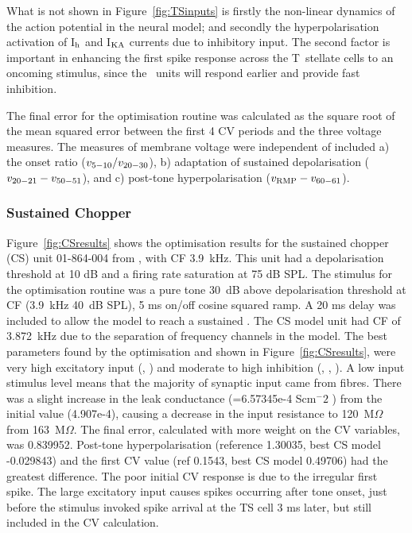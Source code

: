 

What is not shown in Figure~\ref{fig:TSinputs} is firstly the non-linear dynamics of the action potential in the neural model; and secondly the hyperpolarisation activation of I$_{\rm h}$ and I$_{\rm KA}$ currents due to inhibitory input.
The second factor is important in enhancing the first spike response across the T~stellate cells \citep{PaoliniClareyEtAl:2004} to an oncoming stimulus, since the \OnC~units will respond earlier and provide fast inhibition.


The final error for the optimisation routine was calculated as the square root of the mean squared error between the first 4 CV periods and the three voltage measures.
The measures of membrane voltage were independent of \RMP included a) the onset ratio ($v_{\rm 5-10}/v_{\rm 20-30}$), b) adaptation of sustained depolarisation ($v_{\rm 20-21} - v_{\rm 50-51}$), and c) post-tone hyperpolarisation ($v_{\rm RMP} - v_{\rm 60-61}$).


\subsubsection{Sustained Chopper}

Figure~\ref{fig:CSresults} shows the optimisation results for the sustained chopper (CS) unit 01-864-004 from \citep{PaoliniClareyEtAl:2005}, with CF 3.9~kHz.
This unit had a depolarisation threshold at 10 dB and a firing rate saturation at 75 dB SPL.
The stimulus for the optimisation routine was a pure tone 30~dB above depolarisation threshold at CF (3.9~kHz 40~dB SPL), 5 ms on/off cosine squared ramp.
A 20 ms delay was included to allow the model to reach a sustained \RMP. The CS model unit had CF of 3.872~kHz due to the separation of frequency channels in the model.
The best parameters found by the optimisation and shown in Figure~\ref{fig:CSresults}, were very high excitatory input (, ) and moderate to high inhibition (, , ).
A low input stimulus level means that the majority of synaptic input came from \HSR fibres.
There was a slight increase in the leak conductance (\gleak=6.57345e-4 Scm$^-2$ ) from the initial value (4.907e-4), causing a decrease in the input resistance to 120~M$\Omega$ from 163~M$\Omega$.
The final error, calculated with more weight on the CV variables, was 0.839952.
Post-tone hyperpolarisation (reference 1.30035, best CS model -0.029843) and the first CV value (ref 0.1543, best CS model 0.49706) had the greatest difference.
The poor initial CV response is due to the irregular first spike.
The large excitatory \HSR input causes spikes occurring after tone onset, just before the stimulus invoked spike arrival at the TS cell 3 ms later, but still included in the CV calculation.


